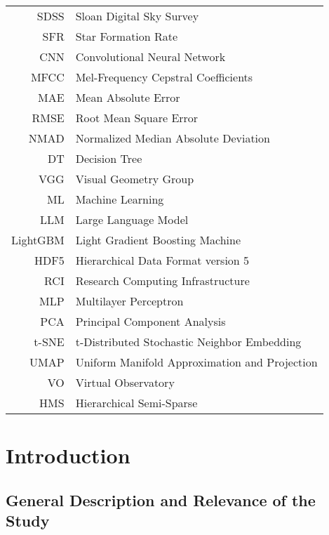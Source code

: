 \documentclass[english,bachelor,oneside]{ctufit-thesis}
\begin{document}
\printabstractpage

\tableofcontents
\listoffigures
\begingroup
\let\clearpage\relax
\listoftables
\thectufitlistingscommand
\endgroup

\chapter{\thectufitabbreviationlabel}
\begin{tabular}{rl}
SDSS  & Sloan Digital Sky Survey \\
SFR   & Star Formation Rate \\
CNN   & Convolutional Neural Network \\
MFCC  & Mel-Frequency Cepstral Coefficients \\
MAE   & Mean Absolute Error \\
RMSE  & Root Mean Square Error \\
NMAD  & Normalized Median Absolute Deviation \\
DT    & Decision Tree \\
VGG   & Visual Geometry Group \\
ML    & Machine Learning \\
LLM   & Large Language Model \\
LightGBM & Light Gradient Boosting Machine \\
HDF5  & Hierarchical Data Format version 5 \\
RCI   & Research Computing Infrastructure \\
MLP   & Multilayer Perceptron \\
PCA   & Principal Component Analysis \\
t-SNE & t-Distributed Stochastic Neighbor Embedding \\
UMAP  & Uniform Manifold Approximation and Projection \\
VO    & Virtual Observatory \\
HMS   & Hierarchical Semi-Sparse \\
\end{tabular}

\resumeTOCentries
\mainmatter\mainmatterinit

\chapter{Introduction}

\section{General Description and Relevance of the Study}
\end{document}
